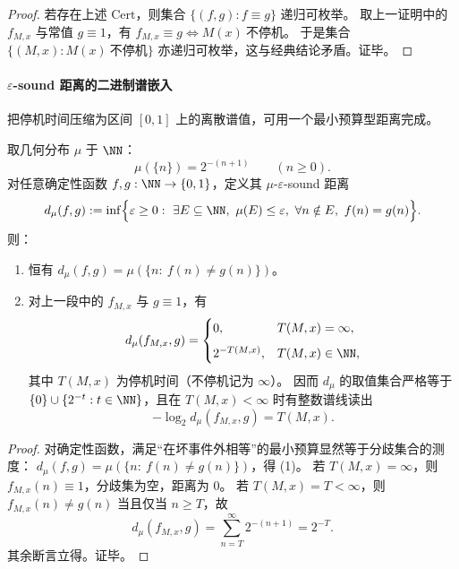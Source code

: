 \begin{proof}
若存在上述 \(\mathrm{Cert}\)，则集合 \(\{(f,g): f\equiv g\}\) 递归可枚举。
取上一证明中的 \(f_{M,x}\) 与常值 \(g\equiv 1\)，有
\(
f_{M,x}\equiv g \Longleftrightarrow M(x)\ \text{不停机}
\)。
于是集合 \(\{(M,x):M(x)\ \text{不停机}\}\) 亦递归可枚举，这与经典结论矛盾。证毕。
\end{proof}

\paragraph{\texorpdfstring{$\varepsilon$}{eps}-sound 距离的二进制谱嵌入}
把停机时间压缩为区间 \([0,1]\) 上的离散谱值，可用一个最小预算型距离完成。

\begin{theorem}\label{thm:fold-computability-eps-sound-distance-halting-spectrum}
取几何分布 \(\mu\) 于 \(\NN\)：
\[
\mu(\{n\})=2^{-(n+1)}\qquad(n\ge 0).
\]
对任意确定性函数 \(f,g:\NN\to\{0,1\}\)，定义其 \(\mu\)-\(\varepsilon\)-sound 距离
\[
d_\mu(f,g):=\inf\Bigl\{\varepsilon\ge 0:\ \exists E\subseteq\NN,\ \mu(E)\le \varepsilon,\ \forall n\notin E,\ f(n)=g(n)\Bigr\}.
\]
则：
\begin{enumerate}
\normalfont
  \item 恒有 \(d_\mu(f,g)=\mu(\{n:\ f(n)\neq g(n)\})\)。
  \item 对上一段中的 \(f_{M,x}\) 与 \(g\equiv 1\)，有
  \[
  d_\mu(f_{M,x},g)=
  \begin{cases}
  0,& T(M,x)=\infty,\\[2mm]
  2^{-T(M,x)},& T(M,x)\in\NN,
  \end{cases}
  \]
  其中 \(T(M,x)\) 为停机时间（不停机记为 \(\infty\)）。
  因而 \(d_\mu\) 的取值集合严格等于
  \(
  \{0\}\cup\{2^{-t}:t\in\NN\}
  \)，且在 \(T(M,x)<\infty\) 时有整数谱线读出
  \[
  -\log_2 d_\mu(f_{M,x},g)=T(M,x).
  \]
\end{enumerate}
\end{theorem}

\begin{proof}
对确定性函数，满足“在坏事件外相等”的最小预算显然等于分歧集合的测度：
\(
d_\mu(f,g)=\mu(\{n:\ f(n)\ne g(n)\})
\)，得 (1)。
若 \(T(M,x)=\infty\)，则 \(f_{M,x}(n)\equiv 1\)，分歧集为空，距离为 \(0\)。
若 \(T(M,x)=T<\infty\)，则 \(f_{M,x}(n)\ne g(n)\) 当且仅当 \(n\ge T\)，故
\[
d_\mu(f_{M,x},g)=\sum_{n=T}^{\infty}2^{-(n+1)}=2^{-T}.
\]
其余断言立得。证毕。
\end{proof}

